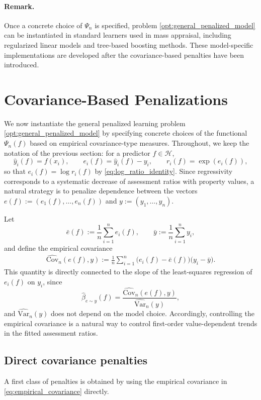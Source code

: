 \documentclass[12pt, draft]{article}
\theoremstyle{plain}
\theoremstyle{definition}
\newcommand{\1}{\mathbf{1}}
\newcommand{\Cov}{\text{Cov}}
\newcommand{\Var}{\text{Var}}
\renewcommand{\H}{\mathcal{H}}
\begin{document}
\paragraph{Remark.}
Once a concrete choice of $\Psi_n$ is specified, problem \eqref{opt:general_penalized_model} can be instantiated in standard learners used in mass appraisal, including regularized linear models and tree-based boosting methods. These model-specific implementations are developed after the covariance-based penalties have been introduced.

\section{Covariance-Based Penalizations}

We now instantiate the general penalized learning problem \eqref{opt:general_penalized_model} by specifying concrete choices of the functional $\Psi_n(f)$ based on empirical covariance-type measures. Throughout, we keep the notation of the previous section: for a predictor $f \in \H$,
\[
\hat y_i(f) = f(x_i),
\qquad
e_i(f) = \hat y_i(f) - y_i,
\qquad
r_i(f) = \exp(e_i(f)),
\]
so that $e_i(f)=\log r_i(f)$ by \eqref{eq:log_ratio_identity}. Since regressivity corresponds to a systematic decrease of assessment ratios with property values, a natural strategy is to penalize dependence between the vectors $e(f):=(e_1(f),\dots,e_n(f))$ and $y:=(y_1,\dots,y_n)$.

Let
\[
\bar e(f) := \frac{1}{n}\sum_{i=1}^n e_i(f),
\qquad
\bar y := \frac{1}{n}\sum_{i=1}^n y_i,
\]
and define the empirical covariance
\begin{align}
    \label{eq:empirical_covariance}
    \widehat{\Cov}_n(e(f),y)
    :=
    \frac{1}{n}\sum_{i=1}^n
    \bigl(e_i(f)-\bar e(f)\bigr)\bigl(y_i-\bar y\bigr).
\end{align}
This quantity is directly connected to the slope of the least-squares regression of $e_i(f)$ on $y_i$, since
\[
\widehat{\beta}_{e\sim y}(f)
=
\frac{\widehat{\Cov}_n(e(f),y)}{\widehat{\Var}_n(y)},
\]
and $\widehat{\Var}_n(y)$ does not depend on the model choice. Accordingly, controlling the empirical covariance is a natural way to control first-order value-dependent trends in the fitted assessment ratios.

\subsection{Direct covariance penalties}

A first class of penalties is obtained by using the empirical covariance in \eqref{eq:empirical_covariance} directly.
\end{document}
